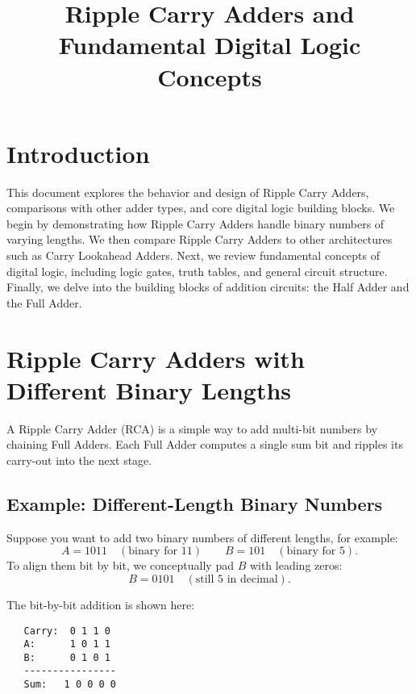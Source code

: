 \documentclass[12pt]{article}
\title{Ripple Carry Adders and Fundamental Digital Logic Concepts}
\author{ }
\date{ }
\begin{document}
\maketitle

\section{Introduction}
This document explores the behavior and design of Ripple Carry Adders, comparisons with other adder types, and core digital logic building blocks. We begin by demonstrating how Ripple Carry Adders handle binary numbers of varying lengths. We then compare Ripple Carry Adders to other architectures such as Carry Lookahead Adders. Next, we review fundamental concepts of digital logic, including logic gates, truth tables, and general circuit structure. Finally, we delve into the building blocks of addition circuits: the Half Adder and the Full Adder.

\section{Ripple Carry Adders with Different Binary Lengths}
A Ripple Carry Adder (RCA) is a simple way to add multi-bit numbers by chaining Full Adders. Each Full Adder computes a single sum bit and ripples its carry-out into the next stage.

\subsection{Example: Different-Length Binary Numbers}
Suppose you want to add two binary numbers of different lengths, for example:
\[
  A = 1011 \quad (\text{binary for } 11) \quad\quad
  B =  101 \quad (\text{binary for } 5).
\]
To align them bit by bit, we conceptually pad $B$ with leading zeros:
\[
  B = 0101 \quad (\text{still } 5 \text{ in decimal}).
\]

\noindent The bit-by-bit addition is shown here:

\begin{verbatim}
   Carry:  0 1 1 0
   A:      1 0 1 1
   B:      0 1 0 1
   ----------------
   Sum:   1 0 0 0 0
\end{verbatim}
\end{document}
